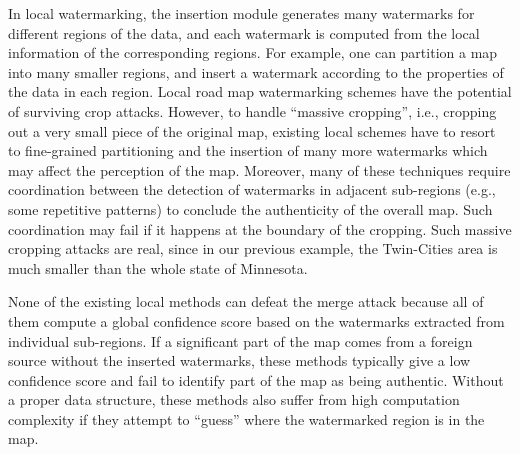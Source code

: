 In local watermarking, %
the insertion module generates many watermarks
for different regions of the data, and each watermark is computed from the
local information of the corresponding regions. For example,  
one can partition a map into many smaller regions,
and insert a watermark according to the properties of 
the data in each region.
Local road map watermarking schemes \cite{OhbuchiUE02,OhbuchiUE03,Voigt:2003} have 
the potential of surviving crop attacks. However, to handle
``massive cropping'', i.e., cropping out a very small piece of the original map,
existing local schemes have to resort to fine-grained partitioning and
the insertion of many more watermarks which may affect the perception of the 
map. Moreover, many of these techniques
require coordination between the detection of watermarks in
adjacent sub-regions (e.g., some repetitive patterns) to conclude the 
authenticity of the overall map. Such coordination may fail if it happens
at the boundary of the cropping.
Such massive cropping attacks are real, since
in our previous example, the Twin-Cities area is much smaller than the whole
state of Minnesota. 

None of the existing local methods can defeat the merge attack because
all of them compute a global confidence score based on the watermarks
extracted from individual sub-regions. If a significant part of the map
comes from a foreign source without the inserted watermarks, these
methods typically give a low confidence score and fail to identify
part of the map as being authentic. Without a proper data structure,
these methods also suffer from high computation complexity if they attempt 
to ``guess'' where the watermarked region is in the map.

%

